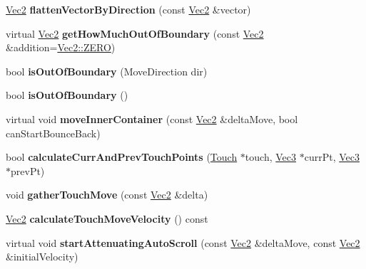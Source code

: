 \begin{DoxyCompactItemize}
\hyperlink{classVec2}{Vec2} {\bfseries flatten\+Vector\+By\+Direction} (const \hyperlink{classVec2}{Vec2} \&vector)
\item 
\mbox{\label{classui_1_1ScrollView_aaac74a17e49c27169de04841a3556ea7}} 
virtual \hyperlink{classVec2}{Vec2} {\bfseries get\+How\+Much\+Out\+Of\+Boundary} (const \hyperlink{classVec2}{Vec2} \&addition=\hyperlink{classVec2_a5c80e2e7c8bd2adcbad2844d060e6245}{Vec2\+::\+Z\+E\+RO})
\item 
\mbox{\label{classui_1_1ScrollView_a14af69cf3ea9804b021bfedf6897060c}} 
bool {\bfseries is\+Out\+Of\+Boundary} (Move\+Direction dir)
\item 
\mbox{\label{classui_1_1ScrollView_aa0bf145e9d0a3c485d0a1fb2ff312517}} 
bool {\bfseries is\+Out\+Of\+Boundary} ()
\item 
\mbox{\label{classui_1_1ScrollView_a89965737904ca2409e6861c5f1e0219f}} 
virtual void {\bfseries move\+Inner\+Container} (const \hyperlink{classVec2}{Vec2} \&delta\+Move, bool can\+Start\+Bounce\+Back)
\item 
\mbox{\label{classui_1_1ScrollView_acf815a397b5f1820ba9050533541c69b}} 
bool {\bfseries calculate\+Curr\+And\+Prev\+Touch\+Points} (\hyperlink{classTouch}{Touch} $\ast$touch, \hyperlink{classVec3}{Vec3} $\ast$curr\+Pt, \hyperlink{classVec3}{Vec3} $\ast$prev\+Pt)
\item 
\mbox{\label{classui_1_1ScrollView_ad80b6a6037a936db6a86050880e57c42}} 
void {\bfseries gather\+Touch\+Move} (const \hyperlink{classVec2}{Vec2} \&delta)
\item 
\mbox{\label{classui_1_1ScrollView_a518d19f47958de8692cc4f5db4e7a9cb}} 
\hyperlink{classVec2}{Vec2} {\bfseries calculate\+Touch\+Move\+Velocity} () const
\item 
\mbox{\label{classui_1_1ScrollView_ac29ca43f6bf0ab9df0b99c30665cdf5a}} 
virtual void {\bfseries start\+Attenuating\+Auto\+Scroll} (const \hyperlink{classVec2}{Vec2} \&delta\+Move, const \hyperlink{classVec2}{Vec2} \&initial\+Velocity)
\item 

\end{DoxyCompactItemize}
